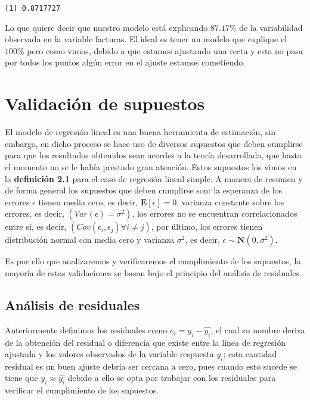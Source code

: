 \documentclass[
  a4paper,
  oneside,
  openany]{book}
\begin{document}
\begin{verbatim}
[1] 0.8717727
\end{verbatim}

Lo que quiere decir que nuestro modelo está explicando \(87.17\%\) de la variabilidad observada en la variable facturas. El ideal es tener un modelo que explique el \(100\%\) pero como vimos, debido a que estamos ajustando una recta y esta no pasa por todos los puntos algún error en el ajuste estamos cometiendo.

\hypertarget{validaciuxf3n-de-supuestos}{%
\chapter{Validación de supuestos}\label{validaciuxf3n-de-supuestos}}

El modelo de regresión lineal es una buena herramienta de estimación, sin embargo, en dicho proceso se hace uso de diversos supuestos que deben cumplirse para que los resultados obtenidos sean acordes a la teoría desarrollada, que hasta el momento no se le había prestado gran atención. Estos supuestos los vimos en la \textbf{definición 2.1} para el caso de regresión lineal simple.
A manera de resumen y de forma general los supuestos que deben cumplirse son: la esperanza de los errores \(\epsilon\) tienen media cero, es decir, \(\mathbf{E}[\epsilon]=0\), varianza constante sobre los errores, es decir, \((Var(\epsilon)=\sigma^2)\), los errores no se encuentran correlacionados entre si, es decir, \((Cov(\epsilon_{i},\epsilon_{j})\forall i\neq j)\), por último, los errores tienen distribución normal con media cero y varianza \(\sigma^2\), es decir, \(\epsilon \sim \mathbf{N}(0,\sigma^2).\)

Es por ello que analizaremos y verificaremos el cumplimiento de los supuestos, la mayoría de estas validaciones se basan bajo el principio del análisis de residuales.

\hypertarget{anuxe1lisis-de-residuales}{%
\section{Análisis de residuales}\label{anuxe1lisis-de-residuales}}

Anteriormente definimos los residuales como \(e_{i}=y_{i}-\hat{y_{i}}\), el cual su nombre deriva de la obtención del residual o diferencia que existe entre la línea de regresión ajustada y los valores observados de la variable respuesta \(y_{i}\); esta cantidad residual es un buen ajuste debría ser cercana a cero, pues cuando esto sucede se tiene que \(y_{i} \approx \hat{y_{i}}\) debido a ello se opta por trabajar con los residuales para verificar el cumplimiento de los supuestos.
\end{document}
